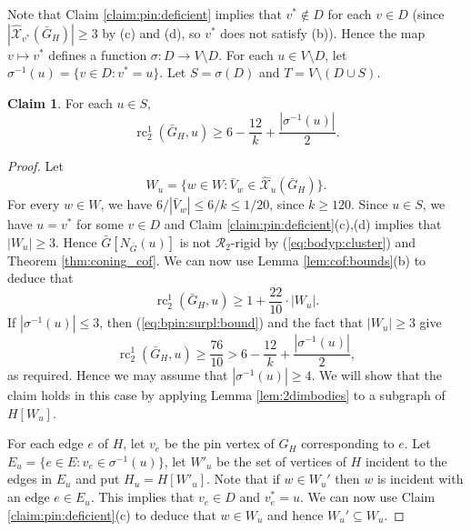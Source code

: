 \documentclass[11pt,a4paper]{article}
\theoremstyle{definition}
\newtheorem{claim}[theorem]{Claim}
\DeclareMathOperator{\rc}{rc}
\newcommand{\cR}{\mathcal{R}}
\newcommand{\hXX}{\hat{\mathcal{X}}}
\begin{document}
Note that Claim \ref{claim:pin:deficient} implies that $v^*\not\in D$ for each $v\in D$ (since $|\hXX_{v^*}(\bar G_H)|\geq 3$ by (c) and (d), so $v^*$ does not  satisfy (b)). Hence the map $v\mapsto v^*$ defines a function $\sigma:D\to V\setminus D$. 
For each $u\in V\setminus D$, let $\sigma^{-1}(u)=\{v\in D: v^*=u\}$. Let
$S=\sigma(D)$ and $T=V\setminus (D\cup S).$

\begin{claim}\label{claim:pin:surplus}
For each $u\in S$, 
\begin{equation*}
\rc_2^1(\bar G_H,u)\geq 
6-\frac{12}{k}+\frac{|\sigma^{-1}(u)|}{2}.
\end{equation*}
\end{claim}
\begin{proof}
Let $$W_u=\{w\in W: \bar V_w\in \hXX_u(\bar G_H)\}.$$
For every $w\in W$, we have 
${6}/|\bar V_w|\leq {6}/{k}\leq {1}/{20}$,
since $k\geq 120$. Since $u\in S$, we have $u=v^*$ for some $v\in D$ and Claim \ref{claim:pin:deficient}(c),(d) implies that $|W_u|\geq 3$. Hence $\bar G[N_{\bar G}(u)]$ is not $\cR_2$-rigid by (\ref{eq:bodyp:cluster}) and Theorem \ref{thm:coning_cof}. We can now use Lemma \ref{lem:cof:bounds}(b) to deduce that
\begin{equation}\label{eq:bpin:surpl:bound}
\rc_2^1(\bar G_H, u)\geq 1+\frac{22}{10}\cdot |W_u|. 			\end{equation}
If $|\sigma^{-1}(u)|\leq 3$, then  (\ref{eq:bpin:surpl:bound}) and the fact that $|W_u|\geq 3$ give $$\rc_2^1(\bar G_H, u)\geq \frac{76}{10} >  6-\frac{12}{k} + \frac{|\sigma^{-1}(u)|}{2},$$ as required. Hence we may assume that 
$|\sigma^{-1}(u)|\geq 4$. We will show that the claim holds in this case by applying Lemma \ref{lem:2dimbodies} to a subgraph of $H[W_u]$.


For each edge $e$ of $H$, let $v_e$ be the pin vertex of $G_H$ corresponding to $e$.
Let $E_u=\{e\in E:v_e\in \sigma^{-1}(u)\}$, let $W'_u$ be the set of vertices of $H$ incident to the edges in $E_u$ and  put  $H_u=H[W'_u]$. Note that if $w\in W_u'$ then $w$ is incident with an edge $e\in E_u$. This implies that $v_e\in D$ and $v_e^*=u$. We can now use Claim \ref{claim:pin:deficient}(c) to deduce that $w\in W_u$ and hence $W_u'\subseteq W_u$.



\end{proof}
\end{document}

